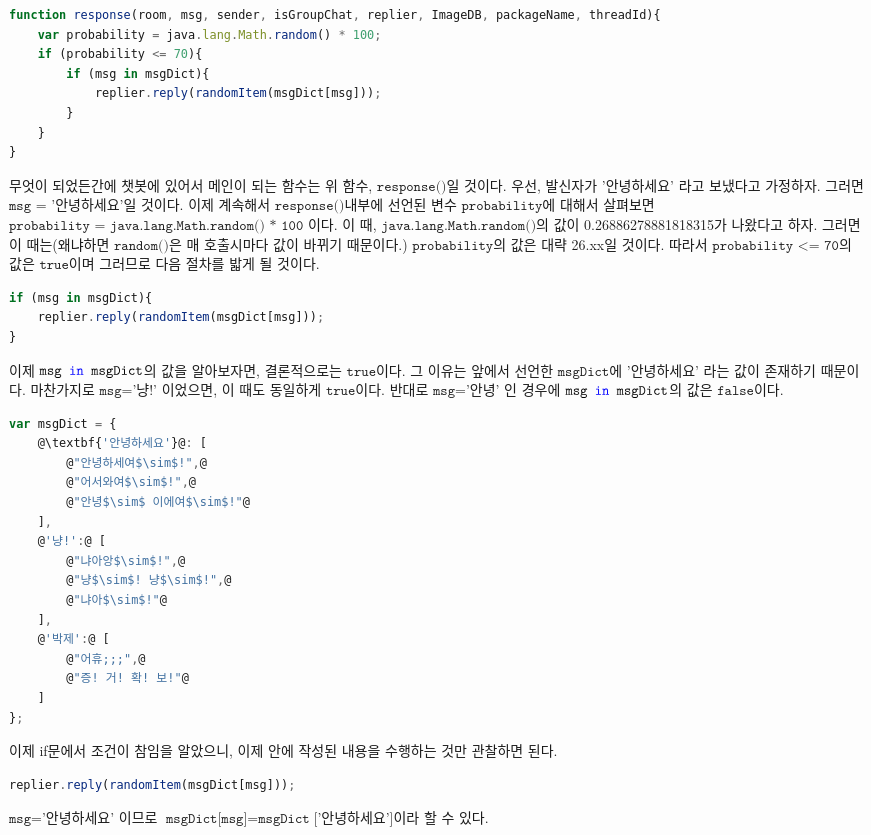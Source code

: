 \documentclass[10pt,a4paper,final]{book}
\begin{document}
\begin{lstlisting}[language=JavaScript,escapeinside=@@]
function response(room, msg, sender, isGroupChat, replier, ImageDB, packageName, threadId){
    var probability = java.lang.Math.random() * 100;
    if (probability <= 70){
        if (msg in msgDict){
            replier.reply(randomItem(msgDict[msg]));
        }
    }
}
\end{lstlisting}
무엇이 되었든간에 챗봇에 있어서 메인이 되는 함수는 위 함수, $\texttt{response()}$일 것이다. 우선, 발신자가 '안녕하세요'
라고 보냈다고 가정하자. 그러면 $\texttt{msg = '안녕하세요'}$일 것이다. 이제 계속해서 $\texttt{response()}$내부에 선언된
변수 $\texttt{probability}$에 대해서 살펴보면 $\texttt{probability = java.lang.Math.random() * 100}$ 이다.
이 때, $\texttt{java.lang.Math.random()}$의 값이 0.26886278881818315가 나왔다고 하자. 그러면
이 때는(왜냐하면 $\texttt{random()}$은 매 호출시마다 값이 바뀌기 때문이다.) $\texttt{probability}$의 값은
대략 26.xx일 것이다. 따라서 $\texttt{probability <= 70}$의 값은 $\texttt{true}$이며 그러므로 다음 절차를 밟게 될 것이다.
\begin{lstlisting}[language=JavaScript,escapeinside=@@]
if (msg in msgDict){
    replier.reply(randomItem(msgDict[msg]));
}
\end{lstlisting}
이제 $\texttt{msg \textcolor{blue}{in} msgDict}$의 값을 알아보자면, 결론적으로는 $\texttt{true}$이다.
그 이유는 앞에서 선언한 $\texttt{msgDict}$에 $\texttt{'안녕하세요'}$ 라는 값이 존재하기 때문이다.
마찬가지로 $\texttt{msg}$='냥!' 이었으면, 이 때도 동일하게 $\texttt{true}$이다. 반대로 $\texttt{msg}$='안녕' 인 경우에
$\texttt{msg \textcolor{blue}{in} msgDict}$의 값은 $\texttt{false}$이다.
\begin{lstlisting}[language=JavaScript,escapeinside=@@, caption={$\texttt{msgDict}$}]
var msgDict = {
    @\textbf{'안녕하세요'}@: [
        @"안녕하세여$\sim$!",@
        @"어서와여$\sim$!",@
        @"안녕$\sim$ 이에여$\sim$!"@
    ],
    @'냥!':@ [
        @"냐아앙$\sim$!",@
        @"냥$\sim$! 냥$\sim$!",@
        @"냐아$\sim$!"@
    ],
    @'박제':@ [
        @"어휴;;;",@
        @"증! 거! 확! 보!"@
    ]
};
\end{lstlisting}
이제 if문에서 조건이 참임을 알았으니, 이제 안에 작성된 내용을 수행하는 것만 관찰하면 된다.
\begin{lstlisting}[language=JavaScript,escapeinside=@@]
replier.reply(randomItem(msgDict[msg]));
\end{lstlisting}
$\texttt{msg}$='안녕하세요' 이므로 $\texttt{msgDict[msg]}=\texttt{msgDict}$['안녕하세요']이라 할 수 있다.
\end{document}
